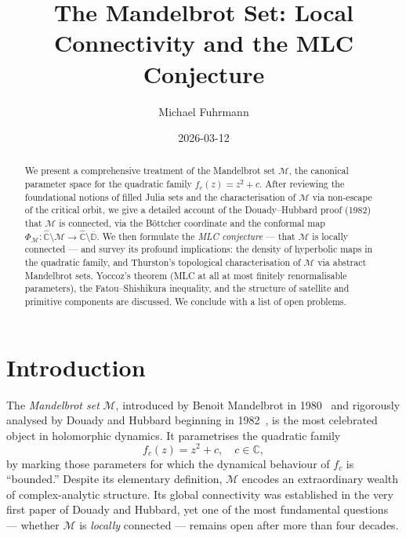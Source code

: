 \documentclass[12pt,a4paper]{amsart}
\theoremstyle{definition}
\theoremstyle{remark}
\begin{document}
\begin{abstract}
We present a comprehensive treatment of the Mandelbrot set $\mathcal{M}$,
the canonical parameter space for the quadratic family $f_c(z) = z^2 + c$.
After reviewing the foundational notions of filled Julia sets and the
characterisation of $\mathcal{M}$ via non-escape of the critical orbit,
we give a detailed account of the Douady--Hubbard proof (1982) that
$\mathcal{M}$ is connected, via the Böttcher coordinate and the
conformal map $\Phi_{\mathcal{M}} \colon \widehat{\mathbb{C}} \setminus \mathcal{M}
\to \widehat{\mathbb{C}} \setminus \overline{\mathbb{D}}$.
We then formulate the \emph{MLC conjecture} — that $\mathcal{M}$ is
locally connected — and survey its profound implications: the density of
hyperbolic maps in the quadratic family, and Thurston's topological
characterisation of $\mathcal{M}$ via abstract Mandelbrot sets.
Yoccoz's theorem (MLC at all at most finitely renormalisable parameters),
the Fatou--Shishikura inequality, and the structure of satellite and
primitive components are discussed. We conclude with a list of open problems.
\end{abstract}

\title{The Mandelbrot Set: Local Connectivity and the MLC Conjecture}
\author{Michael Fuhrmann}
\address{Specialist Mathematics Project, Build 165}
\date{2026-03-12}

\maketitle

\section{Introduction}

The \emph{Mandelbrot set} $\mathcal{M}$, introduced by Benoit Mandelbrot in
1980~\cite{Mandelbrot1980} and rigorously analysed by Douady and Hubbard
beginning in 1982~\cite{DouadyHubbard1982}, is the most celebrated object
in holomorphic dynamics. It parametrises the quadratic family
\[
    f_c(z) = z^2 + c, \quad c \in \mathbb{C},
\]
by marking those parameters for which the dynamical behaviour of $f_c$ is
``bounded.'' Despite its elementary definition, $\mathcal{M}$ encodes
an extraordinary wealth of complex-analytic structure. Its global
connectivity was established in the very first paper of Douady and Hubbard,
yet one of the most fundamental questions — whether $\mathcal{M}$ is
\emph{locally} connected — remains open after more than four decades.
\end{document}

